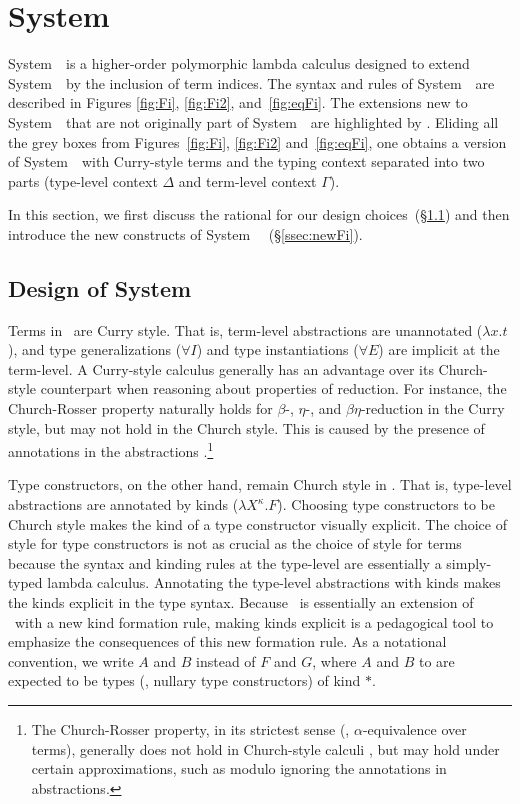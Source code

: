 \section{System \Fi}\label{sec:fi:fi}
System~\Fi\ is a higher-order polymorphic lambda calculus 
designed to extend System~\Fw\ by the inclusion of term indices.
The syntax and rules of System~\Fi\ are described in
Figures \ref{fig:Fi}, \ref{fig:Fi2}, and~\ref{fig:eqFi}. 
The extensions new to System~\Fi\ that are not originally part of System~\Fw\ 
are highlighted by .  Eliding all the grey boxes from
Figures~\ref{fig:Fi}, \ref{fig:Fi2} and~\ref{fig:eqFi}, one obtains
a version of System~\Fw\ with Curry-style terms and the typing context
separated into two parts (type-level context $\Delta$ and
term-level context $\Gamma$). 

In this section, we first discuss the rational for our design
choices~(\S\ref{ssec:rationale}) and then introduce the new constructs of
System~\Fi\ %
(\S\ref{ssec:newFi}).


\subsection{Design of System \Fi%
} \label{ssec:rationale}
Terms in \Fi\ are Curry style. That is, term-level abstractions are unannotated
($\lambda x.t$), and type generalizations ($\forall I$) and type instantiations
($\forall E$) are implicit at the term-level. A Curry-style calculus generally has
an advantage over its Church-style counterpart when reasoning about properties of
reduction. For instance, the Church-Rosser property naturally holds for 
$\beta$-, $\eta$-, and $\beta\eta$-reduction in the Curry style, but may
not hold in the Church style. This is caused by the presence of annotations in
the abstractions \cite{Miquel01}.\footnote{The Church-Rosser property,
in its strictest sense (\ie, $\alpha$-equivalence over terms),
generally does not hold in Church-style calculi , but may hold under
	certain approximations, such as modulo ignoring the annotations
	in abstractions.}

Type constructors, on the other hand, remain Church style in \Fi.
That is, type-level abstractions are
annotated by kinds ($\lambda X^\kappa.F$). Choosing type constructors
to be Church style makes the kind of
a type constructor visually explicit. The choice of style for type constructors
is not as crucial as the choice of style for terms because the syntax and
kinding rules at the type-level are essentially a simply-typed lambda calculus.
Annotating the type-level abstractions with kinds makes the kinds
explicit in the type syntax. Because \Fi\ is essentially an extension of \Fw\
with a new kind formation rule, making kinds explicit is a pedagogical
tool to emphasize the consequences of this new formation rule.
As a notational convention, we write $A$ and $B$  instead of $F$ and $G$,
where $A$ and $B$ to are expected to be types (\ie, nullary type constructors)
of kind $*$.

